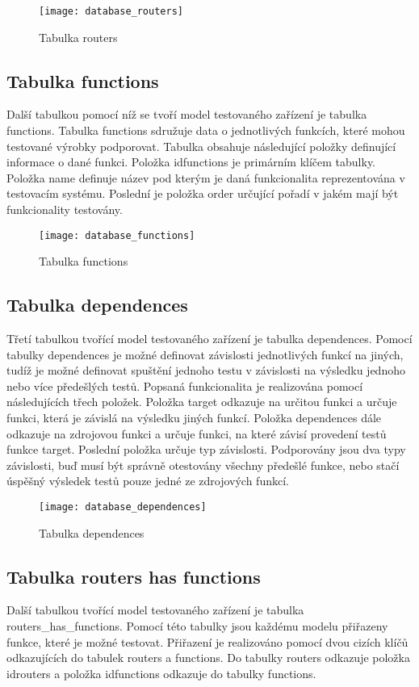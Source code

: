 \begin{figure}[h]
  \centering
  \texttt{[image: database\_routers]}
  \caption{Tabulka routers}
  \label{fig:database_routers}
\end{figure}

\subsection{Tabulka functions}
Další tabulkou pomocí níž se tvoří model testovaného zařízení je tabulka functions. Tabulka functions sdružuje data o jednotlivých funkcích, které mohou testované výrobky podporovat. Tabulka obsahuje následující položky definující informace o dané funkci. Položka idfunctions je primárním klíčem tabulky. Položka name definuje název pod kterým je daná funkcionalita reprezentována v testovacím systému. Poslední je položka order určující pořadí v jakém mají být funkcionality testovány.

\begin{figure}[h]
  \centering
  \texttt{[image: database\_functions]}
  \caption{Tabulka functions}
  \label{fig:database_functions}
\end{figure}

\subsection{Tabulka dependences}
Třetí tabulkou tvořící model testovaného zařízení je tabulka dependences. Pomocí tabulky dependences je možné definovat závislosti jednotlivých funkcí na jiných, tudíž je možné definovat spuštění jednoho testu v závislosti na výsledku jednoho nebo více předešlých testů. Popsaná funkcionalita je realizována pomocí následujících třech položek. Položka target odkazuje na určitou funkci a určuje funkci, která je závislá na výsledku jiných funkcí. Položka dependences dále odkazuje na zdrojovou funkci a určuje funkci, na které závisí provedení testů funkce target. Poslední položka určuje typ závislosti. Podporovány jsou dva typy závislosti, buď musí být správně otestovány všechny předešlé funkce, nebo stačí úspěšný výsledek testů pouze jedné ze zdrojových funkcí.

\begin{figure}[h]
  \centering
  \texttt{[image: database\_dependences]}
  \caption{Tabulka dependences}
  \label{fig:database_dependences}
\end{figure}

\subsection{Tabulka routers has functions}
Další tabulkou tvořící model testovaného zařízení je tabulka routers\_has\_functions. Pomocí této tabulky jsou každému modelu přiřazeny funkce, které je možné testovat. Přiřazení je realizováno pomocí dvou cizích klíčů odkazujících do tabulek routers a functions. Do tabulky routers odkazuje položka idrouters a položka idfunctions odkazuje do tabulky functions.

